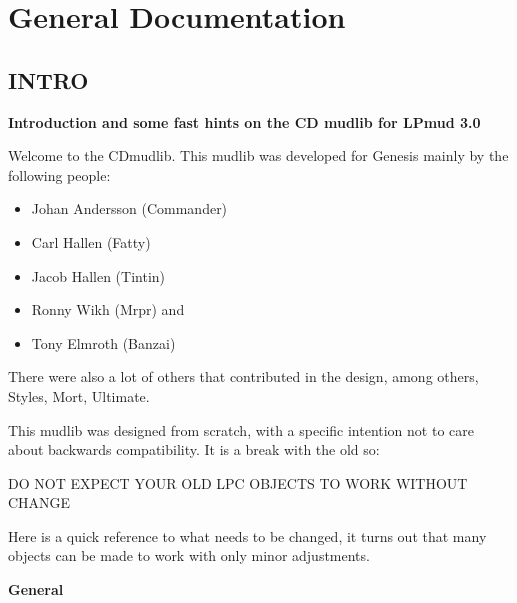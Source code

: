\section{General Documentation}

\subsection{INTRO}

{\bf Introduction and some fast hints on the CD mudlib for LPmud 3.0}

Welcome to the CDmudlib. This mudlib was developed for Genesis mainly by the
following people:

    \begin{itemize}
    \item Johan Andersson (Commander)
    \item Carl Hallen   (Fatty)
    \item Jacob Hallen  (Tintin)
    \item Ronny Wikh    (Mrpr) and
    \item Tony Elmroth  (Banzai)
    \end{itemize}

There were also a lot of others that contributed in the design, among others,
Styles, Mort, Ultimate.

This mudlib was designed from scratch, with a specific intention not to care
about backwards compatibility. It is a break with the old so:

    DO NOT EXPECT YOUR OLD LPC OBJECTS TO WORK WITHOUT CHANGE

Here is a quick reference to what needs to be changed, it turns out that many
objects can be made to work with only minor adjustments.

{\bf General}

